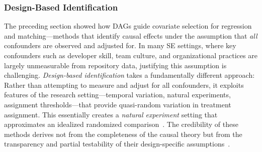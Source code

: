 \subsubsection{Design-Based Identification}
\label{sec:primer-design}

The preceding section showed how DAGs guide covariate selection for regression and matching---methods that identify causal effects under the assumption that \emph{all} confounders are observed and adjusted for.
In many SE settings, where key confounders such as developer skill, team culture, and organizational practices are largely unmeasurable from repository data, justifying this assumption is challenging.
\emph{Design-based identification} takes a fundamentally different approach: Rather than attempting to measure and adjust for all confounders, it exploits features of the research setting---temporal variation, natural experiments, assignment thresholds---that provide quasi-random variation in treatment assignment.
This essentially creates a \emph{natural experiment} setting that approximates an idealized randomized comparison~\cite{dunning2012natural,hernan2020causal}.
The credibility of these methods derives not from the completeness of the causal theory but from the transparency and partial testability of their design-specific assumptions~\cite{angrist2010credibility}.

